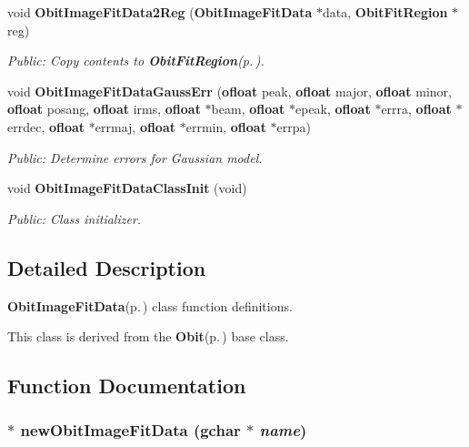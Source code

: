 \begin{CompactItemize}
void {\bf Obit\-Image\-Fit\-Data2Reg} ({\bf Obit\-Image\-Fit\-Data} $\ast$data, {\bf Obit\-Fit\-Region} $\ast$reg)
\begin{CompactList}\small\item\em Public: Copy contents to {\bf Obit\-Fit\-Region}{\rm (p.\,\pageref{structObitFitRegion})}. \item\end{CompactList}\item 
void {\bf Obit\-Image\-Fit\-Data\-Gauss\-Err} ({\bf ofloat} peak, {\bf ofloat} major, {\bf ofloat} minor, {\bf ofloat} posang, {\bf ofloat} irms, {\bf ofloat} $\ast$beam, {\bf ofloat} $\ast$epeak, {\bf ofloat} $\ast$errra, {\bf ofloat} $\ast$errdec, {\bf ofloat} $\ast$errmaj, {\bf ofloat} $\ast$errmin, {\bf ofloat} $\ast$errpa)
\begin{CompactList}\small\item\em Public: Determine errors for Gaussian model. \item\end{CompactList}\item 
void {\bf Obit\-Image\-Fit\-Data\-Class\-Init} (void)
\begin{CompactList}\small\item\em Public: Class initializer. \item\end{CompactList}\end{CompactItemize}


\subsection{Detailed Description}
{\bf Obit\-Image\-Fit\-Data}{\rm (p.\,\pageref{structObitImageFitData})} class function definitions. 

This class is derived from the {\bf Obit}{\rm (p.\,\pageref{structObit})} base class.

\subsection{Function Documentation}
\subsubsection{$\ast$ new\-Obit\-Image\-Fit\-Data (gchar $\ast$ {\em name})}\label{ObitImageFitData_8c_a7}


